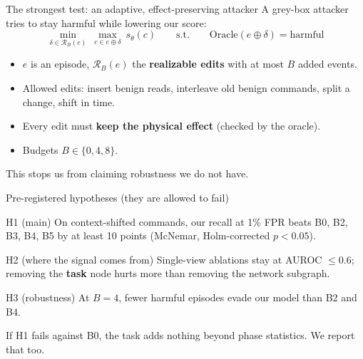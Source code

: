 \documentclass[aspectratio=169]{beamer}
\newcommand{\key}[1]{\textcolor{accent}{\textbf{#1}}}
\newcommand{\warn}[1]{\textcolor{accent2}{\textbf{#1}}}
\begin{document}
\begin{frame}{The strongest test: an adaptive, effect-preserving attacker}
A grey-box attacker tries to stay harmful while lowering our score:
\begin{equation*}
  \min_{\delta\in\mathcal{R}_B(e)}\ \max_{c\in e\oplus\delta}\ s_\theta(c)
  \qquad\text{s.t.}\qquad
  \mathrm{Oracle}(e\oplus\delta) = \text{harmful}
\end{equation*}
\begin{itemize}
  \item $e$ is an episode, $\mathcal{R}_B(e)$ the \key{realizable edits} with at
        most $B$ added events.
  \item Allowed edits: insert benign reads, interleave old benign commands,
        split a change, shift in time.
  \item Every edit must \warn{keep the physical effect} (checked by the oracle).
  \item Budgets $B \in \{0,4,8\}$.
\end{itemize}
\vspace{0.3em}
\centering\footnotesize\textcolor{muted}{This stops us from claiming robustness we do not have.}
\end{frame}

\begin{frame}{Pre-registered hypotheses (they are allowed to fail)}
\begin{block}{H1 (main)}
On context-shifted commands, our recall at 1\% FPR beats B0, B2, B3, B4, B5 by
at least 10 points (McNemar, Holm-corrected $p<0.05$).
\end{block}
\begin{block}{H2 (where the signal comes from)}
Single-view ablations stay at AUROC $\le 0.6$; removing the \key{task} node
hurts more than removing the network subgraph.
\end{block}
\begin{block}{H3 (robustness)}
At $B=4$, fewer harmful episodes evade our model than B2 and B4.
\end{block}
\vspace{0.2em}
\centering\footnotesize\textcolor{muted}{If H1 fails against B0, the task adds nothing beyond phase statistics. We report that too.}
\end{frame}
\end{document}
